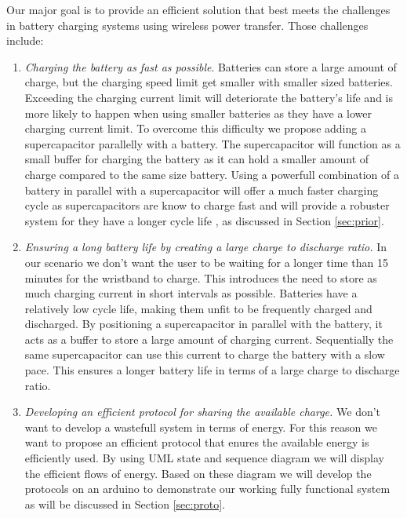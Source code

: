 %
%
Our major goal is to provide an efficient solution that best meets the challenges in battery charging systems using wireless power transfer.
Those challenges include:
\begin{enumerate}
\item \emph{Charging the battery as fast as possible}.
Batteries can store a large amount of charge, but the charging speed limit get smaller with smaller sized batteries. Exceeding the charging current limit will deteriorate the battery's life and is more likely to happen when using smaller batteries as they have a lower charging current limit. To overcome this difficulty we propose adding a supercapacitor parallelly with a battery. The supercapacitor will function as a small buffer for charging the battery as it can hold a smaller amount of charge compared to the same size battery. Using a powerfull combination of a battery in parallel with a supercapacitor will offer a much faster charging cycle as supercapacitors are know to charge fast and will provide a robuster system for they have a longer cycle life \cite{superbattery}, \cite{IAmp} as discussed in Section \ref{sec:prior}.

\item \emph{Ensuring a long battery life by creating a large charge to discharge ratio.}
In our scenario we don't want the user to be waiting for a longer time than 15 minutes for the wristband to charge. This introduces the need to store as much charging current in short intervals as possible. Batteries have a relatively low cycle life, making them unfit to be frequently charged and discharged. By positioning a supercapacitor in parallel with the battery, it acts as a buffer to store a large amount of charging current. Sequentially the same supercapacitor can use this current to charge the battery with a slow pace. This ensures a longer battery life in terms of a large charge to discharge ratio. 

\item \emph{Developing an efficient protocol for sharing the available charge.}
We don't want to develop a wastefull system in terms of energy. For this reason we want to propose an efficient protocol that enures the available energy is efficiently used. By using UML state and sequence diagram we will display the efficient flows of energy. Based on these diagram we will develop the protocols on an arduino to demonstrate our working fully functional system as will be discussed in Section \ref{sec:proto}.
\end{enumerate}

